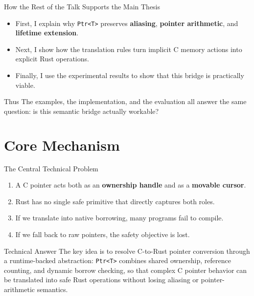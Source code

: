 \documentclass[aspectratio=169,11pt,professionalfonts]{beamer}
\newcommand{\ptr}{\texttt{Ptr<T>}}
\newcommand{\good}[1]{\textcolor{SJTUBlue}{#1}}
\begin{document}
\begin{frame}{How the Rest of the Talk Supports the Main Thesis}
  \begin{itemize}
    \item First, I explain why \ptr{} preserves \textbf{aliasing}, \textbf{pointer arithmetic}, and \textbf{lifetime extension}.
    \item Next, I show how the translation rules turn implicit C memory actions into explicit Rust operations.
    \item Finally, I use the experimental results to show that this bridge is practically viable.
  \end{itemize}

  \vspace{0.8em}
  \begin{block}{Thus}
    The examples, the implementation, and the evaluation all answer the same question:
    \good{is this semantic bridge actually workable?}
  \end{block}
\end{frame}

\section{Core Mechanism}

\begin{frame}{The Central Technical Problem}
  \small
  \begin{enumerate}
    \item A C pointer acts both as an \textbf{ownership handle} and as a \textbf{movable cursor}.
    \item Rust has no single safe primitive that directly captures both roles.
    \item If we translate into native borrowing, many programs fail to compile.
    \item If we fall back to raw pointers, the safety objective is lost.
  \end{enumerate}

  \vspace{0.7em}
  \begin{alertblock}{Technical Answer}
    The key idea is to resolve C-to-Rust pointer conversion through a runtime-backed abstraction:
    \ptr{} combines shared ownership, reference counting, and dynamic borrow checking,
    so that complex C pointer behavior can be translated into safe Rust operations
    without losing aliasing or pointer-arithmetic semantics.
  \end{alertblock}
\end{frame}
\end{document}
